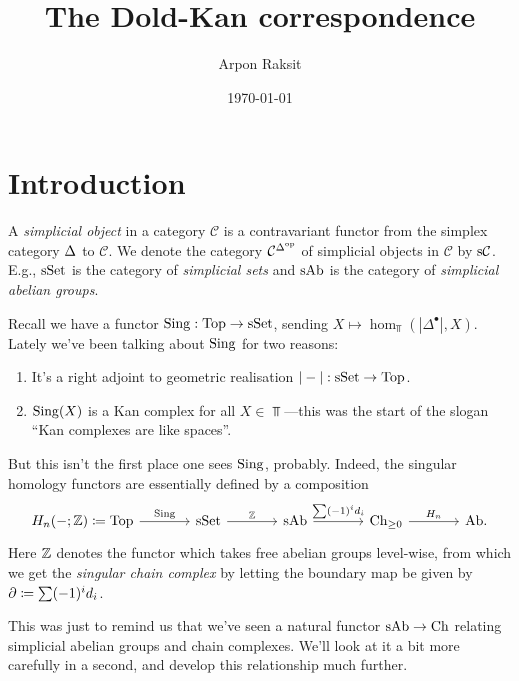 


\title{The Dold-Kan correspondence}
\author{Arpon Raksit}
\date{\today}


\maketitle
\thispagestyle{fancy}


\renewcommand{\C}{\mathcal{C}}

\section{Introduction}

\begin{definition}
  A \textit{simplicial object} in a category $\C$ is a contravariant
  functor from the simplex category $\Delta$ to $\C$. We denote the
  category $\C^{\Simplex^\op}$ of simplicial objects in $\C$ by
  $\s\C$. E.g., $\mathrm{s}\mathrm{Set}$ is the category of \textit{simplicial sets}
  and $\mathrm{s}\mathrm{Ab}$ is the category of \textit{simplicial abelian groups}.
\end{definition}

Recall we have a functor $\operatorname{Sing} : \mathrm{Top} \to \mathrm{s}\mathrm{Set}$, sending $X \mapsto
\hom_\Top(|\Delta^\bullet|, X)$. Lately we've been talking about
$\operatorname{Sing}$ for two reasons:
\begin{enumerate}
\item It's a right adjoint to geometric realisation $|-| : \mathrm{s}\mathrm{Set} \to
  \mathrm{Top}$.
\item $\operatorname{Sing}(X)$ is a Kan complex for all $X \in \Top$---this was the
  start of the slogan ``Kan complexes are like spaces''.
\end{enumerate}
But this isn't the first place one sees $\operatorname{Sing}$, probably. Indeed, the
singular homology functors are essentially defined by a composition
\[
\begin{tikzcd}[column sep = large]
  \H_n(-;\Z) \coloneqq \Top \rar{\Sing} & \s\Set \rar{\Z} & \s\Ab
  \rar{\sum (-1)^i d_i} & \Ch_{\ge 0} \rar{\H_n} & \Ab.
\end{tikzcd}
\]
Here $\mathbb{Z}$ denotes the functor which takes free abelian groups
level-wise, from which we get the \textit{singular chain complex} by
letting the boundary map be given by $\partial \coloneqq \sum (-1)^i d_i$.

This was just to remind us that we've seen a natural functor $\mathrm{s}\mathrm{Ab}
\to \mathrm{Ch}$ relating simplicial abelian groups and chain complexes. We'll
look at it a bit more carefully in a second, and develop this
relationship much further.

